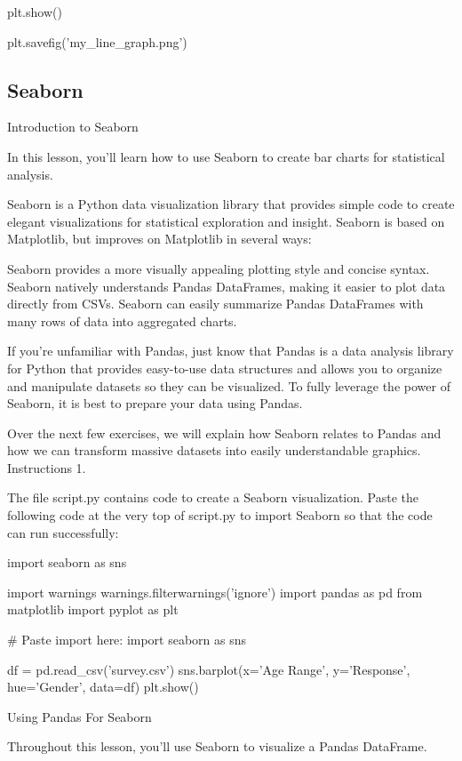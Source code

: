 \documentclass{journal}
\begin{document}
plt.show()

plt.savefig('my_line_graph.png')


\subsection{Seaborn}

Introduction to Seaborn

In this lesson, you’ll learn how to use Seaborn to create bar charts for statistical analysis.

Seaborn is a Python data visualization library that provides simple code to create elegant visualizations for statistical exploration and insight. Seaborn is based on Matplotlib, but improves on Matplotlib in several ways:

    Seaborn provides a more visually appealing plotting style and concise syntax.
    Seaborn natively understands Pandas DataFrames, making it easier to plot data directly from CSVs.
    Seaborn can easily summarize Pandas DataFrames with many rows of data into aggregated charts.

If you’re unfamiliar with Pandas, just know that Pandas is a data analysis library for Python that provides easy-to-use data structures and allows you to organize and manipulate datasets so they can be visualized. To fully leverage the power of Seaborn, it is best to prepare your data using Pandas.

Over the next few exercises, we will explain how Seaborn relates to Pandas and how we can transform massive datasets into easily understandable graphics.
Instructions
1.

The file script.py contains code to create a Seaborn visualization. Paste the following code at the very top of script.py to import Seaborn so that the code can run successfully:

import seaborn as sns

import warnings
warnings.filterwarnings('ignore')
import pandas as pd
from matplotlib import pyplot as plt

# Paste import here:
import seaborn as sns

df = pd.read_csv('survey.csv')
sns.barplot(x='Age Range', y='Response', hue='Gender', data=df)
plt.show()








Using Pandas For Seaborn

Throughout this lesson, you’ll use Seaborn to visualize a Pandas DataFrame.
\end{document}
